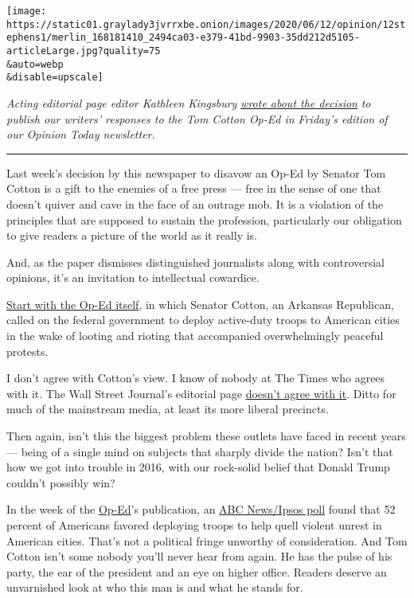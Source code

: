 \texttt{[image: https://static01.graylady3jvrrxbe.onion/images/2020/06/12/opinion/12stephens1/merlin\_168181410\_2494ca03-e379-41bd-9903-35dd212d5105-articleLarge.jpg?quality=75\\\&auto=webp\\\&disable=upscale]}

\emph{Acting editorial page editor Kathleen Kingsbury}
\href{https://www.nytimes3xbfgragh.onion/2020/06/12/opinion/tom-cotton-new-york-times.html}{\emph{wrote
about the decision}} \emph{to publish our writers' responses to the Tom
Cotton Op-Ed in Friday's edition of our Opinion Today newsletter.}

\begin{center}\rule{0.5\linewidth}{\linethickness}\end{center}

Last week's decision by this newspaper to disavow an Op-Ed by Senator
Tom Cotton is a gift to the enemies of a free press --- free in the
sense of one that doesn't quiver and cave in the face of an outrage mob.
It is a violation of the principles that are supposed to sustain the
profession, particularly our obligation to give readers a picture of the
world as it really is.

And, as the paper dismisses distinguished journalists along with
controversial opinions, it's an invitation to intellectual cowardice.

\href{https://www.nytimes3xbfgragh.onion/2020/06/03/opinion/tom-cotton-protests-military.html}{Start
with the Op-Ed itself}, in which Senator Cotton, an Arkansas Republican,
called on the federal government to deploy active-duty troops to
American cities in the wake of looting and rioting that accompanied
overwhelmingly peaceful protests.

I don't agree with Cotton's view. I know of nobody at The Times who
agrees with it. The Wall Street Journal's editorial page
\href{https://www.wsj.com/articles/dont-call-in-the-troops-11591054305}{doesn't
agree with it}. Ditto for much of the mainstream media, at least its
more liberal precincts.

Then again, isn't this the biggest problem these outlets have faced in
recent years --- being of a single mind on subjects that sharply divide
the nation? Isn't that how we got into trouble in 2016, with our
rock-solid belief that Donald Trump couldn't possibly win?

In the week of the
\href{https://www.nytimes3xbfgragh.onion/2020/06/03/opinion/tom-cotton-protests-military.html}{Op-Ed}'s
publication, an
\href{https://abcnews.go.com/Politics/52-americans-support-deploying-military-control-violent-protests/story?id=71097167}{ABC
News/Ipsos poll} found that 52 percent of Americans favored deploying
troops to help quell violent unrest in American cities. That's not a
political fringe unworthy of consideration. And Tom Cotton isn't some
nobody you'll never hear from again. He has the pulse of his party, the
ear of the president and an eye on higher office. Readers deserve an
unvarnished look at who this man is and what he stands for.

